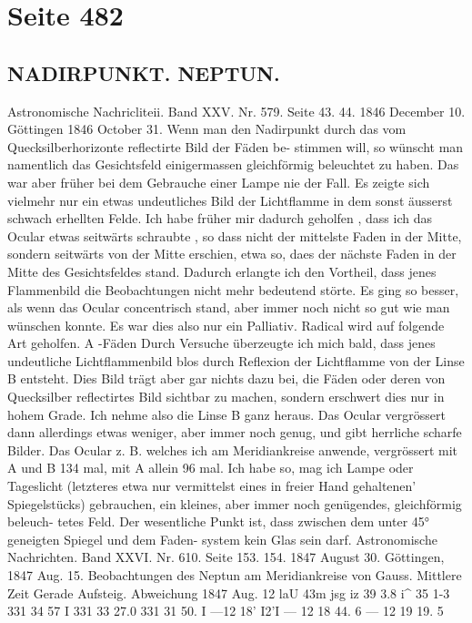 \documentclass[10pt,a4paper]{article}
\begin{document}
\section*{Seite 482}

\subsection*{NADIRPUNKT.    NEPTUN.}

Astronomische  Nachricliteii.     Band  XXV.  Nr.  579.  Seite  43.  44.     1846  December  10.
Göttingen  1846  October  31.
Wenn  man  den  Nadirpunkt  durch  das  vom  Quecksilberhorizonte  reflectirte  Bild  der  Fäden  be-
stimmen will,  so  wünscht  man  namentlich  das  Gesichtsfeld  einigermassen  gleichförmig  beleuchtet  zu
haben.  Das  war  aber  früher  bei  dem  Gebrauche  einer  Lampe  nie  der  Fall.  Es  zeigte  sich  vielmehr
nur  ein  etwas  undeutliches  Bild  der  Lichtflamme  in  dem  sonst  äusserst  schwach  erhellten  Felde.
Ich  habe  früher  mir  dadurch  geholfen ,  dass  ich  das  Ocular  etwas  seitwärts  schraubte ,  so  dass
nicht  der  mittelste  Faden  in  der  Mitte,  sondern  seitwärts  von  der  Mitte  erschien,  etwa  so,  daes  der
nächste  Faden  in  der  Mitte  des  Gesichtsfeldes  stand.  Dadurch  erlangte  ich  den  Vortheil,  dass  jenes
Flammenbild  die  Beobachtungen  nicht  mehr  bedeutend  störte.  Es  ging  so  besser,  als  wenn  das  Ocular
concentrisch  stand,  aber  immer  noch  nicht  so  gut  wie  man  wünschen  konnte.  Es  war  dies  also  nur
ein  Palliativ.     Radical  wird  auf  folgende  Art  geholfen.
A
-Fäden
Durch  Versuche  überzeugte  ich  mich  bald,  dass  jenes  undeutliche  Lichtflammenbild  blos  durch
Reflexion  der  Lichtflamme  von  der  Linse  B  entsteht.  Dies  Bild  trägt  aber  gar  nichts  dazu  bei,  die
Fäden  oder  deren  von  Quecksilber  reflectirtes  Bild  sichtbar  zu  machen,  sondern  erschwert  dies  nur  in
hohem  Grade.  Ich  nehme  also  die  Linse  B  ganz  heraus.  Das  Ocular  vergrössert  dann  allerdings  etwas
weniger,  aber  immer  noch  genug,  und  gibt  herrliche  scharfe  Bilder.  Das  Ocular  z.  B.  welches  ich
am  Meridiankreise  anwende,  vergrössert  mit  A  und  B  134  mal,  mit  A  allein  96  mal.
Ich  habe  so,  mag  ich  Lampe  oder  Tageslicht  (letzteres  etwa  nur  vermittelst  eines  in  freier  Hand
gehaltenen' Spiegelstücks)  gebrauchen,  ein  kleines,  aber  immer  noch  genügendes,  gleichförmig  beleuch-
tetes Feld.  Der  wesentliche  Punkt  ist,  dass  zwischen  dem  unter  45°  geneigten  Spiegel  und  dem  Faden-
system kein  Glas  sein  darf.
Astronomische  Nachrichten.     Band  XXVI.  Nr.  610.  Seite  153.  154.     1847  August  30.
Göttingen,  1847  Aug.  15.
Beobachtungen  des  Neptun  am  Meridiankreise  von  Gauss.
Mittlere  Zeit      Gerade  Aufsteig.  Abweichung
1847  Aug.  12
laU  43m  jsg
iz  39  3.8
i\textasciicircum{}  35  1-3
331  34  57  I
331  33  27.0
331  31  50.  I
---12\glqq{}  18'   I2'I
---  12  18  44. 6
---  12  19  19. 5
\end{document}
